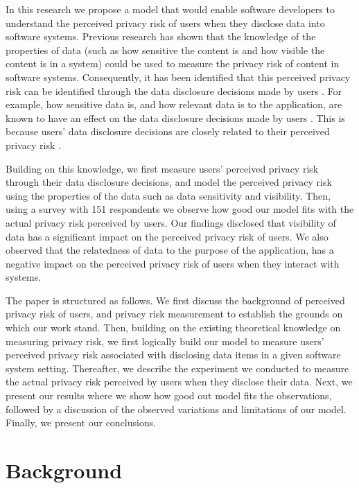 \documentclass[10pt]{article}
\begin{document}
In this research we propose a model that would enable software developers to understand the perceived privacy risk of users when they disclose data into software systems. Previous research has shown that the knowledge of the properties of data (such as how sensitive the content is and how visible the content is in a system) could be used \cite {maximilien2009privacy} to measure the privacy risk of content in software systems. Consequently, it has been identified that this perceived privacy risk can be identified through the data disclosure decisions made by users \cite {malheiros2013fairly}. For example, how sensitive data is, and how relevant data is to the application, are known to have an effect on the data disclosure decisions made by users \cite {malheiros2013fairly}. This is because users' data disclosure decisions are closely related to their perceived privacy risk \cite {kobsa2007privacy, li2010understanding, malhotra2004internet}. 

Building on this knowledge, we first measure users' perceived privacy risk through their data disclosure decisions, and model the perceived privacy risk using the properties of the data such as data sensitivity and visibility. Then, using a survey with 151 respondents we observe how good our model fits with the actual privacy risk perceived by users. Our findings disclosed that visibility of data has a significant impact on the perceived privacy risk of users. We also observed that the relatedness of data to the purpose of the application, has a negative impact on the perceived privacy risk of users when they interact with systems.  

The paper is structured as follows. We first discuss the background of perceived privacy risk of users, and privacy risk measurement to establish the grounds on which our work stand. Then, building on the existing theoretical knowledge on measuring privacy risk, we first logically build our model to measure users' perceived privacy risk associated with disclosing data items in a given software system setting. Thereafter, we describe the experiment we conducted to measure the actual privacy risk perceived by users when they disclose their data. Next, we present our results where we show how good out model fits the observations, followed by a discussion of the observed variations and limitations of our model. Finally, we present our conclusions.

\section {Background}
\end{document}
